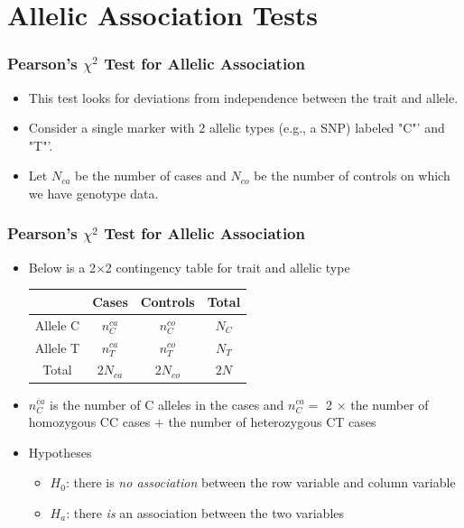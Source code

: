 \documentclass{beamer}
\begin{document}
\section{Allelic Association Tests}

\begin{frame}
\frametitle{\bf Pearson's $\chi^2$ Test for Allelic Association}
\begin{itemize}
\item This test looks for deviations from independence between the trait and allele.
\item Consider a single marker with 2 allelic types (e.g., a SNP) labeled "C"' and "T"'.
\item Let $N_{ca}$ be the number of cases and $N_{co}$ be the number of controls on which we have genotype data.
\end{itemize}
\end{frame}

\begin{frame}
\frametitle{\bf Pearson's $\chi^2$ Test for Allelic Association}
\begin{itemize}
\item Below is a 2$\times$2 contingency table for trait and allelic type   \\

    \begin{center}
      \begin{tabular}{|c|cc|c|}
        \hline
         & Cases & Controls & Total\\
 \hline
  Allele C& $n^{ca}_{C}$ & $n^{co}_{C}$ &$N_C$   \\
  Allele T& $n^{ca}_{T}$ &$ n^{co}_{T}$& $N_T$\\
 \hline
 Total& $2N_{ca}$ & $2N_{co}$ & $2N$ \\
 \hline
      \end{tabular}
    \end{center}


\item $n^{ca}_C$ is the number of C alleles in the cases and $n^{ca}_C=$ 2 $\times$ the number of homozygous CC cases  $+$ the number of heterozygous CT cases
\item Hypotheses
\begin{itemize}

  \item $H_0$: there is \textit{no association} between the row variable and column variable
  \item $H_a$: there \textit{is} an association between the two variables
  \end{itemize}
   \end{itemize}
\end{frame}
\end{document}
